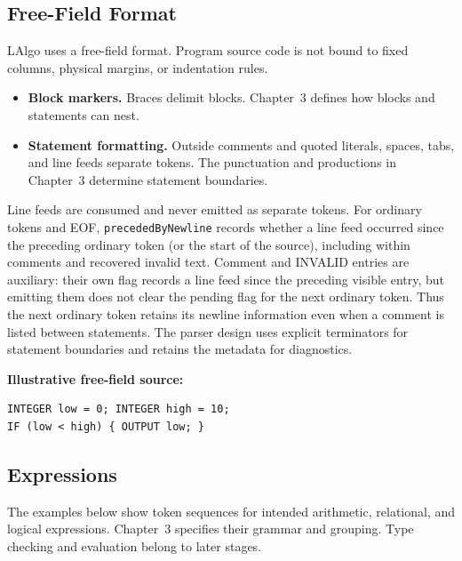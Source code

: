 \documentclass[11pt,a4paper]{article}
\newcommand{\codeinline}[1]{\texttt{#1}}
\begin{document}
\subsection{Free-Field Format}

LAlgo uses a free-field format. Program source code is not bound to fixed columns, physical margins, or indentation rules.

\begin{itemize}
  \item \textbf{Block markers.} Braces delimit blocks. Chapter~3 defines how blocks and statements can nest.
  \item \textbf{Statement formatting.} Outside comments and quoted literals, spaces, tabs, and line feeds separate tokens. The punctuation and productions in Chapter~3 determine statement boundaries.
\end{itemize}

Line feeds are consumed and never emitted as separate tokens. For ordinary tokens and EOF, \codeinline{precededByNewline} records whether a line feed occurred since the preceding ordinary token (or the start of the source), including within comments and recovered invalid text. Comment and INVALID entries are auxiliary: their own flag records a line feed since the preceding visible entry, but emitting them does not clear the pending flag for the next ordinary token. Thus the next ordinary token retains its newline information even when a comment is listed between statements. The parser design uses explicit terminators for statement boundaries and retains the metadata for diagnostics.

\textbf{Illustrative free-field source:}

\begin{lstlisting}
INTEGER low = 0; INTEGER high = 10;
IF (low < high) { OUTPUT low; }
\end{lstlisting}

\subsection{Expressions}

The examples below show token sequences for intended arithmetic, relational, and logical expressions. Chapter~3 specifies their grammar and grouping. Type checking and evaluation belong to later stages.
\end{document}
